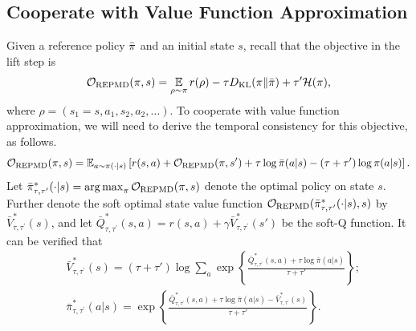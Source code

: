 \subsection{Cooperate with Value Function Approximation}
\label{subsec:repmd_value}
\newcommand{\parV}{V_{\phi}}
\newcommand{\parTargetV}{V_{\bar{\phi}}}
\newcommand{\parQ}{Q_{\psi}}
\newcommand{\parPi}{\pi_{\theta}}
\newcommand{\parQone}{Q_{\psi_1}}
\newcommand{\parQtwo}{Q_{\psi_2}}

Given a reference policy $\bar{\pi}$ and an initial state $s$, recall that the objective in the lift step is 
\[
{\mathcal{O}}_{\text{REPMD}}(\pi, s) =   \operatorname*{\mathbb{E}}\limits_{\rho \sim \pi}{  r(\rho)  - \tau D_{\mathrm{KL}}(\pi \| \bar{\pi}) + \tau^{\prime} \mathcal{H}(\pi)}, 
\]
where $\rho=  (s_1 = s, a_1, s_2, a_2, \ldots)$.
 To cooperate with value function approximation, we will need to derive the temporal consistency for this objective, as follows. 
 \[
 {\mathcal{O}}_{\text{REPMD}}(\pi, s) = \mathbb{E}_{a\sim \pi(\cdot \vert s)} \left[ r(s,a) + {\mathcal{O}}_{\text{REPMD}}(\pi, s')  + \tau \log \bar{\pi}(a|s) - \left(\tau+ \tau' \right) \log \pi(a|s) \right]. 
 \]
Let $\bar{\pi}_{\tau,\tau^{\prime}}^* (\cdot|s) = \operatorname*{arg\,max}_{\pi} {\mathcal{O}}_{\text{REPMD}}(\pi, s) $ denote the optimal policy on state $s$. 
Further denote the soft optimal state value function ${\mathcal{O}}_{\text{REPMD}}(\bar{\pi}_{\tau,\tau^{\prime}}^* (\cdot|s), s)$ by $\bar{V}_{\tau,\tau^{\prime}}^*(s)$, and let  $\bar{Q}_{\tau,\tau^{\prime}}^*(s,a) = r(s,a) + \gamma \bar{V}_{\tau,\tau^{\prime}}^*(s')$ be the soft-Q function.
 It can be verified that 
\begin{equation}
\begin{split}
& \bar{V}_{\tau,\tau^{\prime}}^*(s) = (\tau + \tau') \log \sum_a \exp \left\{ \frac{\bar{Q}_{\tau,\tau^{\prime}}^*(s,a) + \tau \log \bar{\pi}(a|s)} {\tau + \tau'} \right\}; \\
& \bar{\pi}_{\tau,\tau^{\prime}}^* (a|s) = \exp \left\{ \frac{\bar{Q}_{\tau,\tau^{\prime}}^*(s,a) + \tau \log \bar{\pi}(a|s) - \bar{V}_{\tau,\tau^{\prime}}^*(s)}{\tau + \tau'} \right\}.
\end{split}
\label{soft-v-and-pi}
\end{equation}
 
